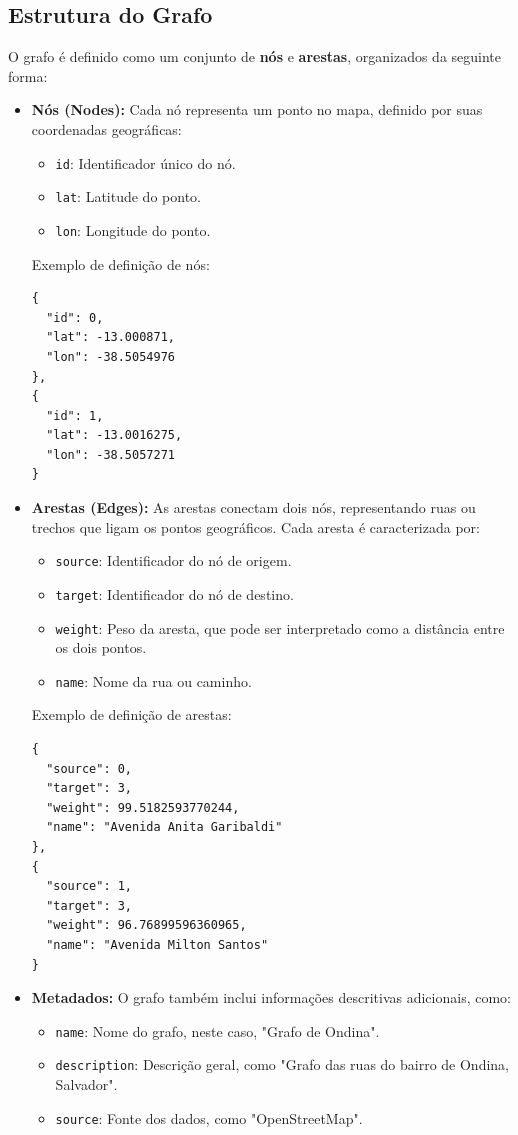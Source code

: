 \documentclass[12pt, a4paper]{report}
\begin{document}
\subsection{Estrutura do Grafo}

O grafo é definido como um conjunto de \textbf{nós} e \textbf{arestas}, organizados da seguinte forma:

\begin{itemize}
    \item \textbf{Nós (Nodes):}
    Cada nó representa um ponto no mapa, definido por suas coordenadas geográficas:
    \begin{itemize}
        \item \texttt{id}: Identificador único do nó.
        \item \texttt{lat}: Latitude do ponto.
        \item \texttt{lon}: Longitude do ponto.
    \end{itemize}
    Exemplo de definição de nós:
\begin{verbatim}
{
  "id": 0,
  "lat": -13.000871,
  "lon": -38.5054976
},
{
  "id": 1,
  "lat": -13.0016275,
  "lon": -38.5057271
}
\end{verbatim}

    \item \textbf{Arestas (Edges):}
    As arestas conectam dois nós, representando ruas ou trechos que ligam os pontos geográficos. Cada aresta é caracterizada por:
    \begin{itemize}
        \item \texttt{source}: Identificador do nó de origem.
        \item \texttt{target}: Identificador do nó de destino.
        \item \texttt{weight}: Peso da aresta, que pode ser interpretado como a distância entre os dois pontos.
        \item \texttt{name}: Nome da rua ou caminho.
    \end{itemize}
    Exemplo de definição de arestas:
\begin{verbatim}
{
  "source": 0,
  "target": 3,
  "weight": 99.5182593770244,
  "name": "Avenida Anita Garibaldi"
},
{
  "source": 1,
  "target": 3,
  "weight": 96.76899596360965,
  "name": "Avenida Milton Santos"
}
\end{verbatim}
    \item \textbf{Metadados:}
    O grafo também inclui informações descritivas adicionais, como:
    \begin{itemize}
        \item \texttt{name}: Nome do grafo, neste caso, "Grafo de Ondina".
        \item \texttt{description}: Descrição geral, como "Grafo das ruas do bairro de Ondina, Salvador".
        \item \texttt{source}: Fonte dos dados, como "OpenStreetMap".
    \end{itemize}
\end{itemize}
\end{document}
